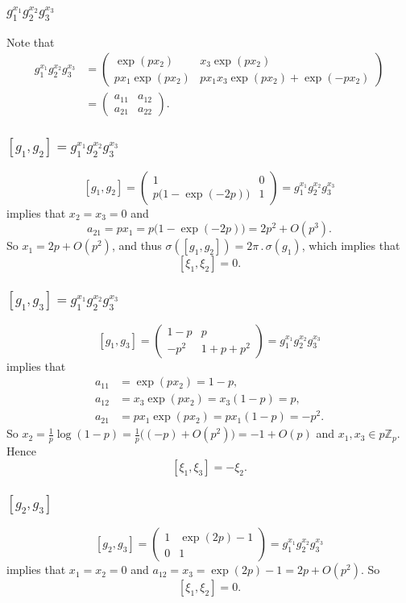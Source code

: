 \documentclass{beamer}
\newcommand*\Z{\mathbb{Z}}
\newcommand*\act{\,.\,} %
\newcommand*\pmat[1]{\begin{pmatrix} #1 \end{pmatrix}}
\begin{document}
\begin{frame}
  \frametitle{$g_{1}^{x_{1}}g_{2}^{x_{2}}g_{3}^{x_{3}}$}

  Note that
  \begin{align*}
    g_{1}^{x_{1}}g_{2}^{x_{2}}g_{3}^{x_{3}} &= \pmat{ \exp(px_{2}) & x_{3}\exp(px_{2}) \\ px_{1}\exp(px_{2}) & px_{1}x_{3}\exp(px_{2}) + \exp(-px_{2}) } \\
    &= \pmat{ a_{11} & a_{12} \\ a_{21} & a_{22} }.
  \end{align*}
\end{frame}

\begin{frame}
  \frametitle{$[g_{1},g_{2}] = g_{1}^{x_{1}}g_{2}^{x_{2}}g_{3}^{x_{3}}$}

  \[ [g_{1},g_{2}] = \pmat{ 1 & 0 \\ p\bigl( 1-\exp(-2p) \bigr) & 1 } = g_{1}^{x_{1}}g_{2}^{x_{2}}g_{3}^{x_{3}} \]
  implies that $x_{2} = x_{3} = 0$ and \[ a_{21} = px_{1} = p\bigl( 1-\exp(-2p) \bigr) = 2p^{2} + O(p^{3}). \] So $x_{1} = 2p + O(p^{2})$, and thus $\sigma([g_{1},g_{2}]) = 2\pi \act \sigma(g_{1})$, which implies that \[ [\xi_{1},\xi_{2}] = 0. \]
\end{frame}

\begin{frame}
  \frametitle{$[g_{1},g_{3}] = g_{1}^{x_{1}}g_{2}^{x_{2}}g_{3}^{x_{3}}$}

  \[ [g_{1},g_{3}] = \pmat{ 1-p & p \\ -p^{2} & 1+p+p^{2} } = g_{1}^{x_{1}}g_{2}^{x_{2}}g_{3}^{x_{3}} \]
  implies that
  \begin{align*}
    a_{11} &= \exp(px_{2}) = 1-p, \\
    a_{12} &= x_{3}\exp(px_{2}) = x_{3}(1-p) = p, \\
    a_{21} &= px_{1}\exp(px_{2}) = px_{1}(1-p) = -p^{2}.
  \end{align*}
  So $x_{2} = \frac{1}{p}\log(1-p) = \frac{1}{p}\bigl( (-p) + O(p^{2}) \bigr) = -1 + O(p)$ and $x_{1},x_{3} \in p\Z_{p}$. Hence \[ [\xi_{1},\xi_{3}] = -\xi_{2}. \]
\end{frame}

\begin{frame}
  \frametitle{$[g_{2},g_{3}]$}

  \[ [g_{2},g_{3}] = \pmat{ 1 & \exp(2p)-1 \\ 0 & 1 } = g_{1}^{x_{1}}g_{2}^{x_{2}}g_{3}^{x_{3}} \]
  implies that $x_{1} = x_{2} = 0$ and $a_{12} = x_{3} = \exp(2p)-1 = 2p + O(p^{2})$. So \[ [\xi_{1},\xi_{2}] = 0. \]
\end{frame}
\end{document}
